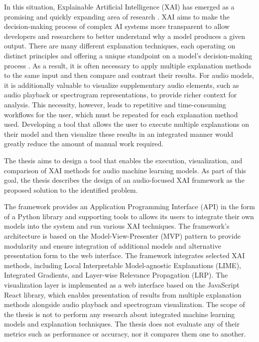 \documentclass[
    bindingoffset=5mm,  %
    footnoteindent=3mm, %
    hyphenation=true    %
]{src/wut-thesis}
\begin{document}
In this situation, Explainable Artificial Intelligence (XAI) has emerged as a promising and quickly expanding area
of research \cite{Arrieta2019-yr}.
XAI aims to make the decision-making process of complex AI systems more transparent to allow developers
and researchers to better understand why a model produces a given output. There are many different explanation
techniques, each operating on distinct principles and offering a unique standpoint
on a model's decision-making process \cite{Abhishek2022-iu}.
As a result, it is often necessary to apply multiple explanation methods to the same input and then compare
and contrast their results. For audio models, it is additionally valuable to visualize supplementary audio elements,
such as audio playback or spectrogram representations, to provide richer context for analysis. This necessity,
however, leads to repetitive and time-consuming workflows for the user, which must be repeated for each
explanation method used. Developing a tool that allows the user to execute multiple explanations on their
model and then visualize these results in an integrated manner would greatly reduce the amount of
manual work required.

The thesis aims to design a tool that enables the execution, visualization, and comparison of XAI methods for
audio machine learning models. As part of this goal, the thesis describes the design of an audio-focused XAI
framework as the proposed solution to the identified problem.

The framework provides an Application Programming Interface (API) in the form of a Python library
and supporting tools to allows its users to integrate their own models into the system and run various XAI techniques.
The framework's architecture is based on the Model-View-Presenter (MVP) pattern to provide modularity and ensure
integration of additional models and alternative presentation form to the web interface. The framework
integrates selected XAI methods, including Local Interpretable Model-agnostic Explanations (LIME), Integrated
Gradients, and Layer-wise Relevance Propagation (LRP). The visualization layer is implemented as a web interface
based on the JavaScript React library, which enables presentation of results from multiple explanation methods
alongside audio playback and spectrogram visualization. The scope of the thesis is not to perform any research about
integrated machine learning models and explanation techniques. The thesis does not evaluate any of their metrics such
as performance or accuracy, nor it compares them one to another.
\end{document}
